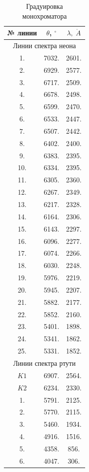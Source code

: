\documentclass[12pt]{kiarticle} %
\begin{document}
	\begin{table}[H]
		\caption{Градуировка монохроматора}
		\begin{center}
			\begin{tabular}{|c|c|c|}
				\hline 
				№  линии & $ \theta $, $ ^\circ $ & $ \lambda, \;\mathring{A} $   \\ 
				\hline 
				\multicolumn{3}{|c|}{Линии спектра неона} \\
				\hline
			 1. & 7032. & 2601. \\
			2. & 6929. & 2577. \\
			3. & 6717. & 2509. \\
			4. & 6678. & 2498. \\
			5. & 6599. & 2470. \\
			6. & 6533. & 2447. \\
			7. & 6507. & 2442. \\
			8. & 6402. & 2400. \\
			9. & 6383. & 2395. \\
			10. & 6334. & 2395. \\
			11. & 6305. & 2360. \\
			12. & 6267. & 2349. \\
			13. & 6217. & 2328. \\
			14. & 6164. & 2306. \\
			15. & 6143. & 2297. \\
			16. & 6096. & 2277. \\
			17. & 6074. & 2266. \\
			18. & 6030. & 2248. \\
			19. & 5976. & 2219. \\
			20. & 5945. & 2207. \\
			21. & 5882. & 2177. \\
			22. & 5852. & 2160. \\
			23. & 5401. & 1898. \\
			24. & 5341. & 1862. \\
			25. & 5331. & 1852. \\
			\hline
				\multicolumn{3}{|c|}{Линии спектра ртути} \\
			\hline
			$ K1 $ & 6907. & 2564. \\
			$ K2 $ & 6234. & 2330. \\
			1. & 5791. & 2125. \\
			2. & 5770. & 2115. \\
			3. & 5460. & 1934. \\
			4. & 4916. & 1516. \\
			5. & 4358. & 856. \\
			6. & 4047. & 306. \\
				\hline 
			\end{tabular} 
		\end{center}
		\label{table g}
	\end{table}
	
\end{document}
